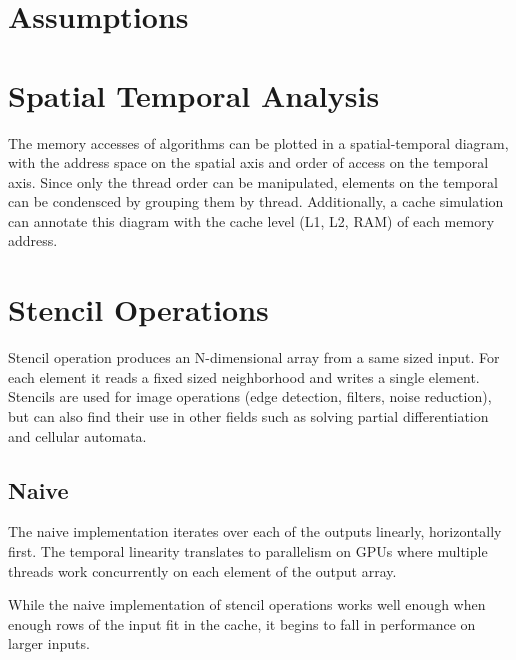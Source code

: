 
\section{Assumptions}

\section{Spatial Temporal Analysis}
The memory accesses of algorithms can be plotted in a spatial-temporal diagram, with the address space on the spatial axis and order of access on the temporal axis.
Since only the thread order can be manipulated, elements on the temporal can be condensced by grouping them by thread.
Additionally, a cache simulation can annotate this diagram with the cache level (L1, L2, RAM) of each memory address.


\section{Stencil Operations}

Stencil operation produces an N-dimensional array from a same sized input.
For each element it reads a fixed sized neighborhood and writes a single element.
Stencils are used for image operations (edge detection, filters, noise reduction), but can also find their use in other fields such as solving partial differentiation\cite{roth1997compilingstencils} and cellular automata.

\subsection{Naive}
\label{sec:stencil_naive}
The naive implementation iterates over each of the outputs linearly, horizontally first.
The temporal linearity translates to parallelism on GPUs where multiple threads work concurrently on each element of the output array.

While the naive implementation of stencil operations works well enough when enough rows of the input fit in the cache, it begins to fall in performance on larger inputs.


